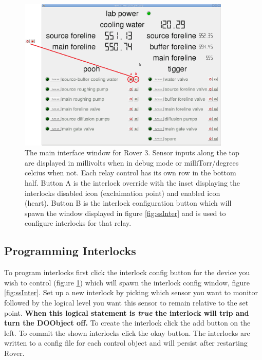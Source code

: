 \documentclass{article}
\begin{document}
\begin{figure}
\centering
\includegraphics[width=0.9\textwidth]{ssMain.png}
\caption{The main interface window for Rover 3. Sensor inputs along the top are displayed in millivolts when in debug mode or milliTorr/degrees celcius when not. Each relay control has its own row in the bottom half. Button A is the interlock override with the inset displaying the interlocks disabled icon (exclaimation point) and enabled icon (heart). Button B is the interlock configuration button which will spawn the window displayed in figure \ref{fig:ssInter} and is used to configure interlocks for that relay.}
\label{fig:ssMain}
\end{figure}


\subsection{Programming Interlocks}
To program interlocks first click the interlock config button for the device you wish to control (figure \ref{fig:ssMain}) which will spawn the interlock config window, figure \ref{fig:ssInter}. Set up a new interlock by picking which sensor you want to monitor followed by the logical level you want this sensor to remain relative to the set point. \textbf{When this logical statement is \emph{true} the interlock will trip and turn the DOObject off.} To create the interlock click the add button on the left. To commit the shown interlocks click the okay button. The interlocks are written to a config file for each control object and will persist after restarting Rover.
\end{document}
